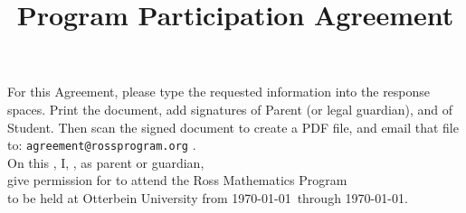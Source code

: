 \documentclass{ross}
\title{Program Participation Agreement}
\begin{document}
\maketitle
For this Agreement, please type the requested information into the response spaces.
Print the document, add signatures of Parent (or legal guardian), and of Student.  
Then scan the signed document to create a PDF file, and email that file
to: \texttt{agreement@rossprogram.org} . \\

On this , I, , 
as parent or guardian, \\[5pt]
give permission for  to attend the Ross Mathematics Program \\[5pt]
to be held at Otterbein University from \startsunday\today\ through
\finishfriday\today.
\end{document}

